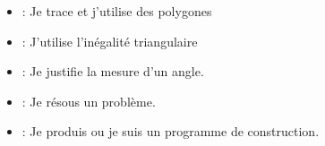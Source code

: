 %		

\begin{mycomp}
	\begin{itemize}
		\item {} :   Je trace et j'utilise des polygones
		\item {} : J’utilise l’inégalité triangulaire
		\item {} :  Je justifie la mesure d'un angle.
		\item {} :  Je résous un problème.
		\item {} :  Je produis ou je suis un programme de construction.
		
	\end{itemize}
\end{mycomp}


